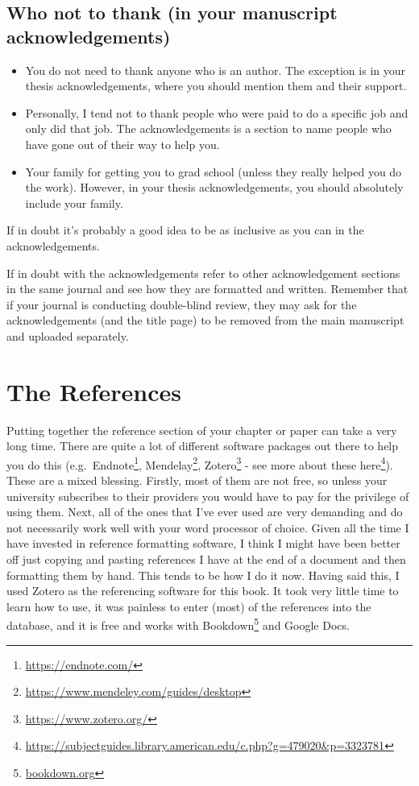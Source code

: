 \documentclass[
]{krantz}
\providecommand{\tightlist}{%
  \setlength{\itemsep}{0pt}\setlength{\parskip}{0pt}}
\renewcommand{\href}[2]{#2\footnote{\url{#1}}}
\begin{document}
\hypertarget{who-not-to-thank-in-your-manuscript-acknowledgements}{%
\subsection{Who not to thank (in your manuscript acknowledgements)}\label{who-not-to-thank-in-your-manuscript-acknowledgements}}

\begin{itemize}
\tightlist
\item
  You do not need to thank anyone who is an author. The exception is in your thesis acknowledgements, where you should mention them and their support.
\item
  Personally, I tend not to thank people who were paid to do a specific job and only did that job. The acknowledgements is a section to name people who have gone out of their way to help you.
\item
  Your family for getting you to grad school (unless they really helped you do the work). However, in your thesis acknowledgements, you should absolutely include your family.
\end{itemize}

If in doubt it's probably a good idea to be as inclusive as you can in the acknowledgements.

If in doubt with the acknowledgements refer to other acknowledgement sections in the same journal and see how they are formatted and written. Remember that if your journal is conducting double-blind review, they may ask for the acknowledgements (and the title page) to be removed from the main manuscript and uploaded separately.

\hypertarget{references}{%
\section{The References}\label{references}}

Putting together the reference section of your chapter or paper can take a very long time. There are quite a lot of different software packages out there to help you do this (e.g.~\href{https://endnote.com/}{Endnote}, \href{https://www.mendeley.com/guides/desktop}{Mendelay}, \href{https://www.zotero.org/}{Zotero} - see more about these \href{https://subjectguides.library.american.edu/c.php?g=479020\&p=3323781}{here}). These are a mixed blessing. Firstly, most of them are not free, so unless your university subscribes to their providers you would have to pay for the privilege of using them. Next, all of the ones that I've ever used are very demanding and do not necessarily work well with your word processor of choice. Given all the time I have invested in reference formatting software, I think I might have been better off just copying and pasting references I have at the end of a document and then formatting them by hand. This tends to be how I do it now. Having said this, I used Zotero as the referencing software for this book. It took very little time to learn how to use, it was painless to enter (most) of the references into the database, and it is free and works with \href{bookdown.org}{Bookdown} and Google Docs.
\end{document}
